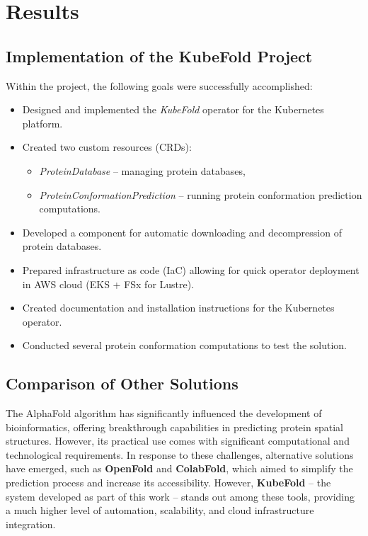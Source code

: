 \chapter{Results}

\section{Implementation of the KubeFold Project}

Within the project, the following goals were successfully accomplished:
\begin{itemize}
    \item Designed and implemented the \textit{KubeFold} operator for the Kubernetes platform.
    \item Created two custom resources (CRDs):
    \begin{itemize}
        \item \textit{ProteinDatabase} – managing protein databases,
        \item \textit{ProteinConformationPrediction} – running protein conformation prediction computations.
    \end{itemize}
    \item Developed a component for automatic downloading and decompression of protein databases.
    \item Prepared infrastructure as code (IaC) allowing for quick operator deployment in AWS cloud (EKS + FSx for Lustre).
    \item Created documentation and installation instructions for the Kubernetes operator.
    \item Conducted several protein conformation computations to test the solution.
\end{itemize}


\section{Comparison of Other Solutions}

The AlphaFold algorithm has significantly influenced the development of bioinformatics, offering breakthrough capabilities in predicting protein spatial structures.
However, its practical use comes with significant computational and technological requirements.
In response to these challenges, alternative solutions have emerged, such as \textbf{OpenFold}\cite{openfold} and \textbf{ColabFold}\cite{colabfold}, which aimed to simplify the prediction process and increase its accessibility.
However, \textbf{KubeFold} – the system developed as part of this work – stands out among these tools, providing a much higher level of automation, scalability, and cloud infrastructure integration.


